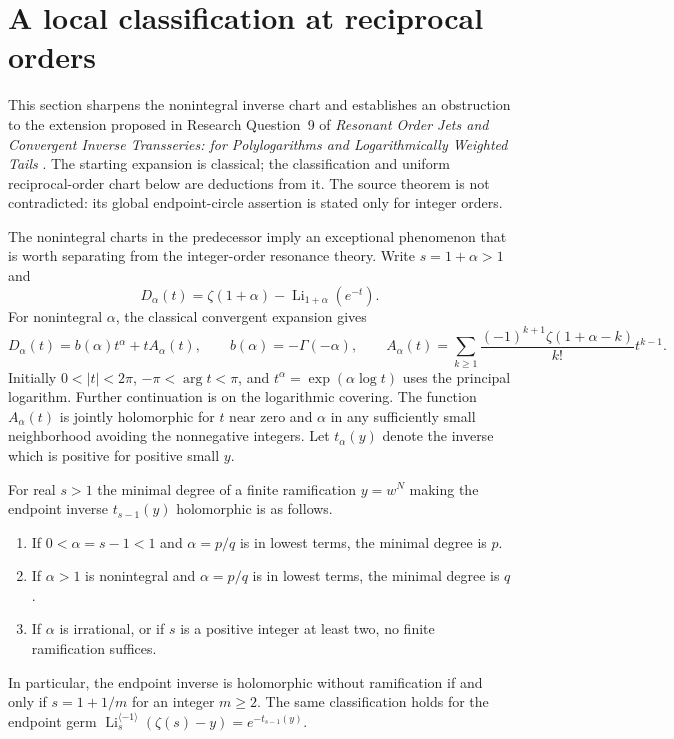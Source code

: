 \section{A local classification at reciprocal orders}
\label{sec:endpoints}

This section sharpens the nonintegral inverse chart and establishes
an obstruction to the extension proposed in Research Question~9 of
\emph{Resonant Order Jets and Convergent Inverse Transseries:
for Polylogarithms and Logarithmically Weighted Tails}
\cite{repo-inverse}. The starting expansion is classical; the
classification and uniform reciprocal-order chart below are deductions
from it. The source theorem is not contradicted: its global
endpoint-circle assertion is stated only for integer orders.

The nonintegral charts in the predecessor imply an exceptional phenomenon
that is worth separating from the integer-order resonance theory.
Write $s=1+\alpha>1$ and
\[
 D_\alpha(t)=\zeta(1+\alpha)-\operatorname{Li}_{1+\alpha}(e^{-t}).
\]
For nonintegral $\alpha$, the classical convergent expansion \cite{dlmf-polylog} gives
\[
 D_\alpha(t)=b(\alpha)t^\alpha+tA_\alpha(t),\qquad
 b(\alpha)=-\Gamma(-\alpha),\qquad
 A_\alpha(t)=\sum_{k\ge1}\frac{(-1)^{k+1}\zeta(1+\alpha-k)}{k!}t^{k-1}.
\]
Initially $0<|t|<2\pi$, $-\pi<\arg t<\pi$, and
$t^\alpha=\exp(\alpha\log t)$ uses the principal logarithm.
Further continuation is on the logarithmic covering.
The function $A_\alpha(t)$ is jointly holomorphic for $t$ near zero and
$\alpha$ in any sufficiently small neighborhood avoiding the nonnegative
integers.  Let $t_\alpha(y)$ denote the inverse which is positive for
positive small $y$.

\begin{theorem}\label{thm:ramification}
For real $s>1$ the minimal degree of a finite ramification $y=w^N$
making the endpoint inverse $t_{s-1}(y)$ holomorphic is as follows.
\begin{enumerate}
\item If $0<\alpha=s-1<1$ and $\alpha=p/q$ is in lowest terms,
the minimal degree is $p$.
\item If $\alpha>1$ is nonintegral and $\alpha=p/q$ is in lowest
terms, the minimal degree is $q$.
\item If $\alpha$ is irrational, or if $s$ is a positive integer
at least two, no finite ramification suffices.
\end{enumerate}
In particular, the endpoint inverse is holomorphic without ramification
if and only if $s=1+1/m$ for an integer $m\ge2$.
The same classification holds for the endpoint germ
$\operatorname{Li}_{s}^{\langle-1\rangle}(\zeta(s)-y)=e^{-t_{s-1}(y)}$.
\end{theorem}


